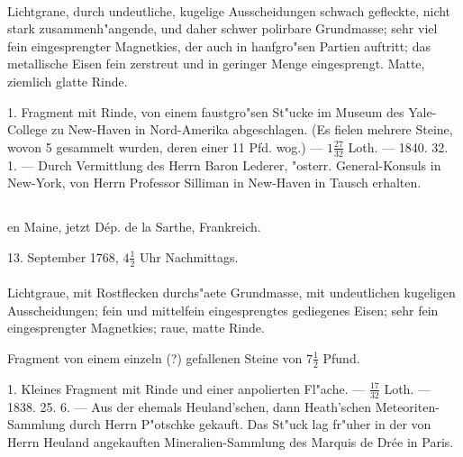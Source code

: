 \documentclass[a4paper, 11pt, oneside, polutonikogreek, german]{article}
\begin{document}
\paragraph{}
Lichtgrane, durch undeutliche, kugelige Ausscheidungen schwach gefleckte, nicht stark zusammenh"angende, und daher schwer polirbare Grundmasse; sehr viel fein eingesprengter Magnetkies, der auch in hanfgro"sen Partien auftritt; das metallische Eisen fein zerstreut und in geringer Menge eingesprengt. Matte, ziemlich glatte Rinde.

1. Fragment mit Rinde, von einem faustgro"sen St"ucke im Museum des Yale-College zu New-Haven in Nord-Amerika abgeschlagen. (Es fielen mehrere Steine, wovon 5 gesammelt wurden, deren einer 11 Pfd. wog.) --- $1\frac{27}{32}$ Loth. --- 1840. 32. 1. --- Durch Vermittlung des Herrn Baron Lederer, "osterr. General-Konsuls in New-York, von Herrn Professor Silliman in New-Haven in Tausch erhalten.
\subsection[\frakfamily{Lucé.}]{}
\begin{center}

en Maine, jetzt Dép. de la Sarthe, Frankreich.

13. September 1768, $4\frac{1}{2}$ Uhr Nachmittags.
\end{center}
\paragraph{}
Lichtgraue, mit Rostflecken durchs"aete Grundmasse, mit undeutlichen kugeligen Ausscheidungen; fein und mittelfein eingesprengtes gediegenes Eisen; sehr fein eingesprengter Magnetkies; raue, matte Rinde.

Fragment von einem einzeln (?) gefallenen Steine von $7\frac{1}{2}$ Pfund.

1. Kleines Fragment mit Rinde und einer anpolierten Fl"ache. --- $\frac{17}{32}$ Loth. --- 1838. 25. 6. --- Aus der ehemals Heuland'schen, dann Heath'schen Meteoriten-Sammlung durch Herrn P"otschke gekauft. Das St"uck lag fr"uher in der von Herrn Heuland angekauften Mineralien-Sammlung des Marquis de Drée in Paris.

\setlength{\leftskip}{10mm}
\setlength{\parindent}{0pt}
\end{document}

